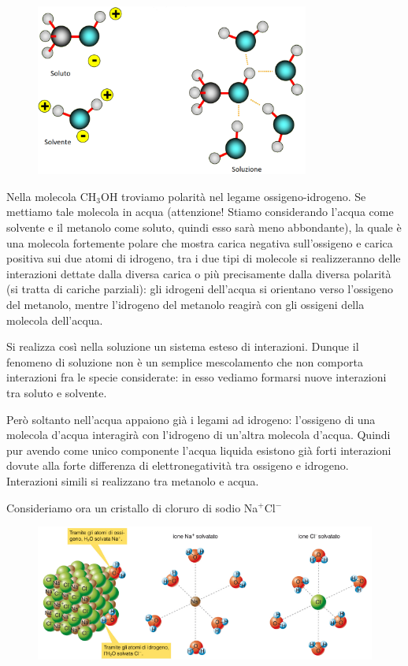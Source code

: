\begin{figure}[htp]
    \centering
    \includegraphics[width=9cm]{immagini/acido_acetico.png}
\end{figure}

Nella molecola CH$_3$OH troviamo polarità nel legame ossigeno-idrogeno. Se mettiamo tale molecola in acqua (attenzione! Stiamo considerando l'acqua come solvente e il metanolo come soluto, quindi esso sarà meno abbondante), la quale è una molecola fortemente polare che mostra carica negativa sull'ossigeno e carica positiva sui due atomi di idrogeno, tra i due tipi di molecole si realizzeranno delle interazioni dettate dalla diversa carica o più precisamente dalla diversa polarità (si tratta di cariche parziali): gli idrogeni dell'acqua si orientano verso l'ossigeno del metanolo, mentre l'idrogeno del metanolo reagirà con gli ossigeni della molecola dell'acqua.

Si realizza così nella soluzione un sistema esteso di interazioni. Dunque il fenomeno di soluzione non è un semplice mescolamento che non comporta interazioni fra le specie considerate: in esso vediamo formarsi nuove interazioni tra soluto e solvente.

Però soltanto nell'acqua appaiono già i legami ad idrogeno: l'ossigeno di una molecola d'acqua interagirà con l'idrogeno di un'altra molecola d'acqua. Quindi pur avendo come unico componente l'acqua liquida esistono già forti interazioni dovute alla forte differenza di elettronegatività tra ossigeno e idrogeno. Interazioni simili si realizzano tra metanolo e acqua.

\vspace{0.2cm} Consideriamo ora un cristallo di cloruro di sodio Na$^+$Cl$^-$

\begin{figure}[htp]
    \centering
    \includegraphics[width=12cm]{immagini/solvatazione_cloruro_di_sodio.png}
\end{figure}

